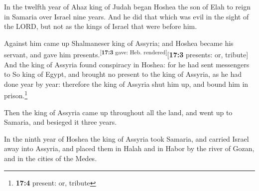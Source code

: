  In the twelfth year of Ahaz king of Judah began Hoshea
the son of Elah to reign in Samaria over Israel nine years.
 And he did that which was evil in the sight of the LORD,
but not as the kings of Israel that were before him.

 Against him came up Shalmaneser king of Assyria; and
Hoshea became his servant, and gave him
presents.\textsuperscript{{[}\textbf{17:3} gave: Heb.
rendered{]}}{[}\textbf{17:3} presents: or, tribute{]}  And
the king of Assyria found conspiracy in Hoshea: for he had sent
messengers to So king of Egypt, and brought no present to the king of
Assyria, as he had done year by year: therefore the king of Assyria shut
him up, and bound him in prison.\footnote{\textbf{17:4} present: or,
  tribute}

 Then the king of Assyria came up throughout all the land,
and went up to Samaria, and besieged it three years.

 In the ninth year of Hoshea the king of Assyria took
Samaria, and carried Israel away into Assyria, and placed them in Halah
and in Habor by the river of Gozan, and in the cities of the Medes.

